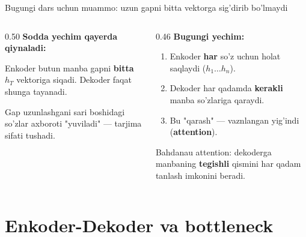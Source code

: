 \documentclass[aspectratio=169,11pt]{beamer}
\begin{document}
\begin{frame}{Bugungi dars uchun muammo: uzun gapni bitta vektorga sig'dirib bo'lmaydi}
  \begin{columns}[T]
    \begin{column}{0.50\textwidth}
      \textbf{Sodda yechim qayerda qiynaladi:}\\[3pt]
      \small
      \begin{tcolorbox}[warnbox,title={Sobit kontekst vektori},top=2pt,bottom=2pt]
        \footnotesize
        Enkoder butun manba gapni \textbf{bitta} $h_T$ vektoriga siqadi. Dekoder
        faqat shunga tayanadi.
      \end{tcolorbox}
      \vspace{3pt}
      \begin{tcolorbox}[warnbox,title={Uzun gap = ko'p yo'qotish},top=2pt,bottom=2pt]
        \footnotesize
        Gap uzunlashgani sari boshidagi so'zlar axboroti "yuviladi" --- tarjima
        sifati tushadi.
      \end{tcolorbox}
    \end{column}
    \begin{column}{0.46\textwidth}
      \textbf{Bugungi yechim:}\\[4pt]
      \small
      \begin{enumerate}\setlength\itemsep{4pt}
        \item Enkoder \textbf{har} so'z uchun holat saqlaydi ($h_1\ldots h_n$).
        \item Dekoder har qadamda \textbf{kerakli} manba so'zlariga qaraydi.
        \item Bu "qarash" --- vaznlangan yig'indi (\textbf{attention}).
      \end{enumerate}
      \vspace{5pt}
      \begin{tcolorbox}[okbox,top=2pt,bottom=2pt]
        \footnotesize
        Bahdanau attention: dekoderga manbaning \textbf{tegishli} qismini har qadam
        tanlash imkonini beradi.
      \end{tcolorbox}
    \end{column}
  \end{columns}
\end{frame}

\section[Enkoder-Dekoder]{Enkoder-Dekoder va bottleneck}
\end{document}
